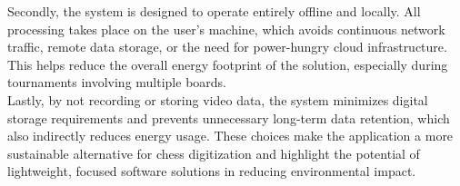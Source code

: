 Secondly, the system is designed to operate entirely offline and locally. All processing takes place on the user's machine, which avoids continuous network traffic, remote data storage, or the need for power-hungry cloud infrastructure. This helps reduce the overall energy footprint of the solution, especially during tournaments involving multiple boards. \\

Lastly, by not recording or storing video data, the system minimizes digital storage requirements and prevents unnecessary long-term data retention, which also indirectly reduces energy usage. These choices make the application a more sustainable alternative for chess digitization and highlight the potential of lightweight, focused software solutions in reducing environmental impact.

